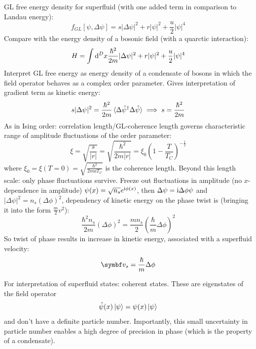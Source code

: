 \documentclass[../notes.tex]{subfiles}
\begin{document}
GL free energy density for superfluid (with one added term in comparison to Landau energy):
\begin{equation}
	f_{GL} [\psi, \Delta \psi] = s \vert \Delta \psi \vert^2 + r \vert \psi \vert^2 + \frac{u}{2} \vert \psi \vert^4
\end{equation}
Compare with the energy density of a bosonic field (with a quarctic interaction):
\begin{align}
	H = \int \odif[order=D]{x} \frac{\hbar^2}{2m} \vert \Delta \psi \vert^2 + r \vert \psi \vert^2 + \frac{u}{2} \vert \psi \vert^4
\end{align}
Interpret GL free energy as energy density of a condensate of bosons in which the field operator behaves as a complex order parameter.
Gives interpretation of gradient term as kinetic energy:
\begin{equation}
	s \vert \Delta \psi \vert^2 = \frac{\hbar^2}{2m} \braket{\Delta \hat{\psi}^{\dagger} \Delta \hat{\psi}} \implies s = \frac{\hbar^2}{2m}
\end{equation}
As in Ising order: correlation length/GL-coherence length governs characteristic range of amplitude fluctuations of the order parameter:
\begin{equation}
	\xi = \sqrt{\frac{s}{\vert r \vert}} = \sqrt{\frac{\hbar^2}{2m \vert r \vert}} = \xi_0 (1 - \frac{T}{T_C})^{-\frac{1}{2}}
\end{equation}
where \(\xi_0 = \xi(T=0) = \sqrt{\frac{\hbar^2}{2 m a T_C}}\) is the coherence length.
Beyond this length scale: only phase fluctuations survive.
Freeze out fluctuations in amplitude (no \(x\)-dependence in amplitude) \(\psi(x) = \sqrt{n_s} e^{\mathrm{i} \phi(x)}\), then \(\Delta \psi = \mathrm{i} \Delta \phi \psi\) and \(\vert \Delta \psi \vert^2 = n_s (\Delta \phi)^2\), dependency of kinetic energy on the phase twist is (bringing it into the form \(\frac{m}{2} v^2\)):
\begin{equation}
	\frac{\hbar^2 n_s}{2m} (\Delta \phi)^2 = \frac{m n_s}{2} (\frac{\hbar}{m} \Delta \phi)^2
\end{equation}
So twist of phase results in increase in kinetic energy, associated with a superfluid velocity:
\begin{equation}
	\vb{v}_s = \frac{\hbar}{m} \Delta \phi
\end{equation}

For interpretation of superfluid states: coherent states.
These are eigenstates of the field operator
\begin{equation}
	\hat{\psi}(x) \ket{\psi} = \psi (x) \ket{\psi} 
\end{equation}
and don't have a definite particle number.
Importantly, this small uncertainty in particle number enables a high degree of precision in phase (which is the property of a condensate).
\end{document}
